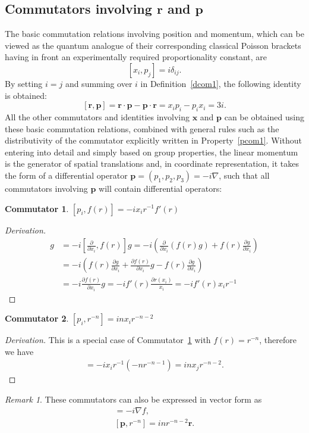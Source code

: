 \documentclass[12pt,a4paper]{report}
\theoremstyle{definition}
\newtheorem{commutator}{Commutator}[section]
\newenvironment{derivation}
  {\renewcommand\qedsymbol{$\square$}\begin{proof}[Derivation]}
  {\end{proof}}
\theoremstyle{remark}
\newtheorem*{remark}{Remark}
\theoremstyle{remark}
\begin{document}
\begin{appendices}
\section{Commutators involving $\mathbf{r}$ and $\mathbf{p}$}
The basic commutation relations involving position and momentum, which can be viewed as the quantum analogue of their corresponding classical Poisson brackets having in front an experimentally required proportionality constant, are
\begin{equation}\label{erp1}
[x_i,p_j]=i\delta_{ij}.
\end{equation}
By setting $i=j$ and summing over $i$ in Definition~\ref{dcom1}, the following identity is obtained:
\begin{equation}\label{erp2}
[\textbf{r},\textbf{p}]=\textbf{r}\cdot\textbf{p}-\textbf{p}\cdot\textbf{r}=x_ip_i-p_ix_i=3i.
\end{equation}
All the other commutators and identities involving $\textbf{x}$ and $\textbf{p}$ can be obtained using these basic commutation relations, combined with general rules such as the distributivity of the commutator explicitly written in Property~\ref{pcom1}.
Without entering into detail and simply based on group properties, the linear momentum is the generator of spatial translations and, in coordinate representation, it takes the form of a differential operator $\textbf{p}=(p_1,p_2,p_3)=-i\nabla$, such that all commutators involving $\textbf{p}$ will contain differential operators:
\begin{commutator}\label{crp1}
$[p_i,f(r)]=-i x_i r^{-1} f'(r)$ 
\end{commutator}
\begin{derivation} 
\begin{align*}
[p_i,f(r)]g &= -i\left[\frac{\partial}{\partial x_i},f(r)\right]g= -i\left(\frac{\partial}{\partial x_i}(f(r)g)+f(r)\frac{\partial g}{\partial x_i}\right) \\
&= -i\left(f(r)\frac{\partial g}{\partial x_i}+\frac{\partial f(r)}{\partial x_i}g-f(r)\frac{\partial g}{\partial x_i}\right) \\
&= -i\frac{\partial f(r)}{\partial x_i}g= -i f'(r)\frac{\partial r(x_i)}{x_i}= -i f'(r) x_i r^{-1}
\end{align*}
\end{derivation}

\begin{commutator}\label{crp2}
$[p_i,r^{-n}]=i nx_ir^{-n-2}$ 
\end{commutator}
\begin{derivation}
This is a special case of Commutator~\ref{crp1} with $f(r)=r^{-n}$, therefore we have
\begin{align*}
[p_i,r^{-n}]=-i x_ir^{-1}(-nr^{-n-1})=i nx_jr^{-n-2}.
\end{align*}
\end{derivation}
\begin{remark}These commutators can also be expressed in vector form as
\begin{align*}
[\textbf{p},f(r)]=-i\nabla f, \\
[\textbf{p},r^{-n}]=i nr^{-n-2}\textbf{r}.
\end{align*}
\end{remark}


\end{appendices}
\end{document}
